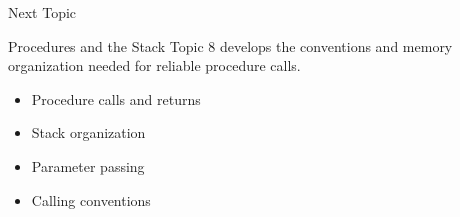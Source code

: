 \documentclass[aspectratio=169,11pt,t]{beamer}
\begin{document}



\begin{frame}{Next Topic}
\begin{block}{Procedures and the Stack}
Topic 8 develops the conventions and memory organization needed for reliable procedure calls.
\end{block}
\vspace{0.25cm}
\begin{itemize}
\item Procedure calls and returns
\item Stack organization
\item Parameter passing
\item Calling conventions
\end{itemize}
\end{frame}
\end{document}
